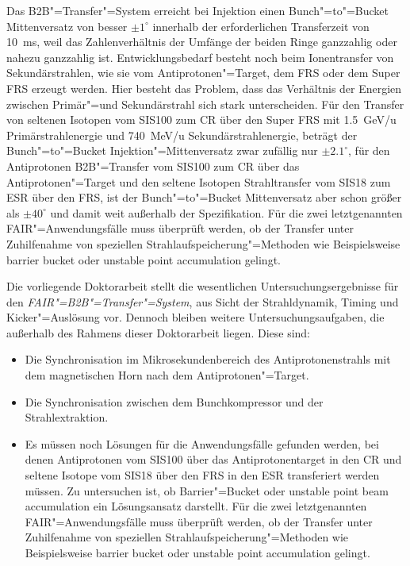 Das B2B"=Transfer"=System erreicht bei Injektion einen Bunch"=to"=Bucket Mittenversatz von besser $\pm1^\circ$ innerhalb der erforderlichen Transferzeit von \SI{10}{\ms}, weil das Zahlenverh\"altnis der Umf\"ange der beiden Ringe ganzzahlig oder nahezu ganzzahlig ist. Entwicklungsbedarf besteht noch beim Ionentransfer von Sekund\"arstrahlen, wie sie vom Antiprotonen"=Target, dem FRS oder dem Super FRS erzeugt werden. Hier besteht das Problem, dass das Verh\"altnis der Energien zwischen Prim\"ar"=und
Sekund\"arstrahl sich stark unterscheiden. F\"ur den Transfer von seltenen Isotopen vom SIS100 zum CR \"uber den Super FRS mit \SI{1.5}{GeV/u} Prim\"arstrahlenergie und \SI{740}{MeV/u} Sekund\"arstrahlenergie, betr\"agt der Bunch"=to"=Bucket Injektion"=Mittenversatz zwar zufällig nur $\pm2.1^\circ$, f\"ur den Antiprotonen B2B"=Transfer vom SIS100 zum CR \"uber das Antiprotonen"=Target und den seltene Isotopen Strahltransfer vom SIS18 zum ESR \"uber den FRS, ist der Bunch"=to"=Bucket Mittenversatz aber schon gr\"o\ss{}er als $\pm40^\circ$ und damit weit au\ss{}erhalb der Spezifikation. F\"ur die zwei letztgenannten FAIR"=Anwendungsf\"alle muss \"uberpr\"uft werden, ob der Transfer unter Zuhilfenahme von speziellen Strahlaufspeicherung"=Methoden wie Beispielsweise barrier bucket oder unstable point accumulation gelingt.



Die vorliegende Doktorarbeit stellt die wesentlichen Untersuchungsergebnisse f\"ur den \textit{FAIR"=B2B"=Transfer"=System}, aus Sicht der Strahldynamik, Timing und Kicker"=Ausl\"osung vor. Dennoch bleiben weitere Untersuchungsaufgaben, die au\ss{}erhalb des Rahmens dieser Doktorarbeit liegen. Diese sind:
\begin{itemize}

\item Die Synchronisation im Mikrosekundenbereich des Antiprotonenstrahls mit dem magnetischen Horn nach dem Antiprotonen"=Target.
\item Die Synchronisation zwischen dem Bunchkompressor und der Strahlextraktion.
\item Es m\"ussen noch L\"osungen f\"ur die Anwendungsf\"alle gefunden werden, bei denen Antiprotonen vom SIS100 \"uber das Antiprotonentarget in den CR und seltene Isotope vom SIS18 \"uber den FRS in den ESR transferiert werden m\"ussen. Zu untersuchen ist, ob Barrier"=Bucket oder unstable point beam accumulation ein L\"osungsansatz darstellt. F\"ur die zwei letztgenannten FAIR"=Anwendungsf\"alle muss \"uberpr\"uft werden, ob der Transfer unter Zuhilfenahme von speziellen Strahlaufspeicherung"=Methoden wie Beispielsweise barrier bucket oder unstable point accumulation gelingt.
\end{itemize}

